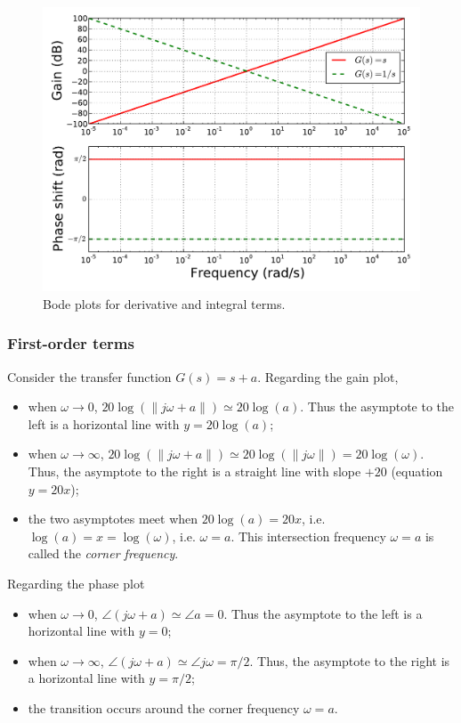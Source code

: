 \documentclass[a4paper,11pt]{report}
\theoremstyle{definition}
\begin{document}
\begin{figure}[H]
  \centering
  \includegraphics[width=12cm]{fig/bode-di.pdf}
  \caption{Bode plots for derivative and integral terms.}
  \label{fig:bode-di}
\end{figure}


\subsubsection{First-order terms}

Consider the transfer function $G(s)=s+a$. Regarding the gain plot,
\begin{itemize}
\item when $\omega\to 0$, $20\log(\|j\omega+a\|)\simeq
  20\log(a)$. Thus the asymptote to the left is a horizontal line
  with $y=20\log(a)$;
\item when $\omega\to\infty$, $20\log(\|j\omega+a\|)\simeq
  20\log(\|j\omega\|)=20\log(\omega)$. Thus, the asymptote to the
  right is a straight line with slope $+20$ (equation $y=20x$);
\item the two asymptotes meet when $20\log(a)=20x$,
  i.e. $\log(a)=x=\log(\omega)$, i.e. $\omega=a$. This intersection
  frequency $\omega=a$ is called the \emph{corner frequency}.
\end{itemize}

Regarding the phase plot
\begin{itemize}
\item when $\omega\to 0$, $\angle(j\omega+a) \simeq \angle a =
  0$. Thus the asymptote to the left is a horizontal line with $y=0$;
\item when $\omega\to\infty$, $\angle(j\omega+a) \simeq \angle j\omega
  = \pi/2$. Thus, the asymptote to the right is a horizontal line with
  $y=\pi/2$;
\item the transition occurs around the corner frequency $\omega=a$.
\end{itemize}
\end{document}

